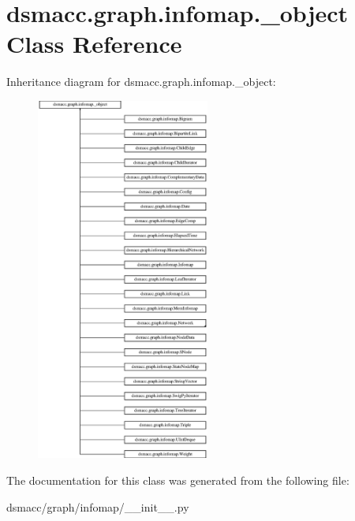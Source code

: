 \hypertarget{classdsmacc_1_1graph_1_1infomap_1_1__object}{}\section{dsmacc.\+graph.\+infomap.\+\_\+object Class Reference}
\label{classdsmacc_1_1graph_1_1infomap_1_1__object}
Inheritance diagram for dsmacc.\+graph.\+infomap.\+\_\+object\+:\begin{figure}[H]
\begin{center}
\leavevmode
\includegraphics[height=12.000000cm]{classdsmacc_1_1graph_1_1infomap_1_1__object}
\end{center}
\end{figure}


The documentation for this class was generated from the following file\+:\begin{DoxyCompactItemize}
\item 
dsmacc/graph/infomap/\+\_\+\+\_\+init\+\_\+\+\_\+.\+py\end{DoxyCompactItemize}
